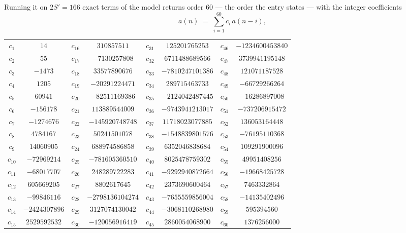 \documentclass[11pt,a4paper]{article}
\theoremstyle{plain}
\theoremstyle{definition}
\begin{document}
Running it on $2S'=166$ exact terms of the model returns order $60$ --- the order the
entry states --- with the integer coefficients
\[
a(n)\;=\;\sum_{i=1}^{60}c_i\,a(n-i),
\]
\begin{center}\small
\begin{tabular}{cccccccc}
$c_{1}$ & $14$ & $c_{16}$ & $310857511$ & $c_{31}$ & $125201765253$ & $c_{46}$ & $-1234600453840$ \\
$c_{2}$ & $55$ & $c_{17}$ & $-7130257808$ & $c_{32}$ & $6711488689566$ & $c_{47}$ & $3739941195148$ \\
$c_{3}$ & $-1473$ & $c_{18}$ & $33577890676$ & $c_{33}$ & $-7810247101386$ & $c_{48}$ & $121071187528$ \\
$c_{4}$ & $1205$ & $c_{19}$ & $-20291224471$ & $c_{34}$ & $289715463733$ & $c_{49}$ & $-66729266264$ \\
$c_{5}$ & $60941$ & $c_{20}$ & $-82511169386$ & $c_{35}$ & $-2124042487445$ & $c_{50}$ & $-16286897008$ \\
$c_{6}$ & $-156178$ & $c_{21}$ & $113889544009$ & $c_{36}$ & $-9743941213017$ & $c_{51}$ & $-737206915472$ \\
$c_{7}$ & $-1274676$ & $c_{22}$ & $-145920748748$ & $c_{37}$ & $11718023077885$ & $c_{52}$ & $136053164448$ \\
$c_{8}$ & $4784167$ & $c_{23}$ & $50241501078$ & $c_{38}$ & $-1548839801576$ & $c_{53}$ & $-76195110368$ \\
$c_{9}$ & $14060905$ & $c_{24}$ & $688974586858$ & $c_{39}$ & $6352046838684$ & $c_{54}$ & $109291900096$ \\
$c_{10}$ & $-72969214$ & $c_{25}$ & $-781605360510$ & $c_{40}$ & $8025478759302$ & $c_{55}$ & $49951408256$ \\
$c_{11}$ & $-68017707$ & $c_{26}$ & $248289722283$ & $c_{41}$ & $-9292940872664$ & $c_{56}$ & $-19668425728$ \\
$c_{12}$ & $605669205$ & $c_{27}$ & $8802617645$ & $c_{42}$ & $2373690600464$ & $c_{57}$ & $7463332864$ \\
$c_{13}$ & $-99846116$ & $c_{28}$ & $-2798136104274$ & $c_{43}$ & $-7655559856004$ & $c_{58}$ & $-14135402496$ \\
$c_{14}$ & $-2424307896$ & $c_{29}$ & $3127074130042$ & $c_{44}$ & $-3068110268980$ & $c_{59}$ & $595394560$ \\
$c_{15}$ & $2529592532$ & $c_{30}$ & $-120056916419$ & $c_{45}$ & $2860054068900$ & $c_{60}$ & $1376256000$ \\
\end{tabular}
\end{center}
\end{document}
